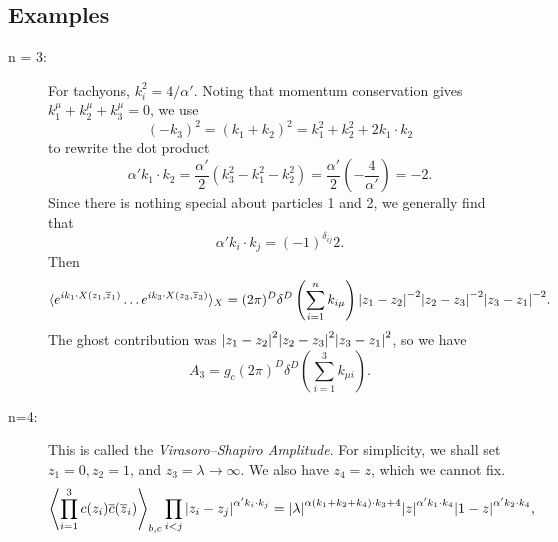 
\subsection{Examples}%
\label{sub:examples}

\begin{description}
  \item[n = 3:]  For tachyons, $k_i^2 = 4 / \alpha'$. Noting that momentum conservation gives $k_1^{\mu} + k_2^{\mu} + k_3^{\mu} = 0$, we use
    \begin{equation}
      (-k_3)^2 = (k_1 + k_2)^2 = k_1^2 + k_2^2 + 2 k_1 \cdot k_2
    \end{equation}
    to rewrite the dot product
    \begin{equation}
      \alpha' k_1 \cdot k_2 = \frac{\alpha'}{2} (k_3^2 - k_1^2 - k_2^2) = \frac{\alpha'}{2} \left(-\frac{4}{\alpha'}\right) = -2.
    \end{equation}
    Since there is nothing special about particles 1 and 2, we generally find that
    \begin{equation}
      \alpha' k_i \cdot k_j = (-1)^{\delta_{ij}} 2.
    \end{equation}
    Then
    \begin{equation}
      \langle e^{i k_1 \cdot X(z_1, \overline{z}{}_1)} \dots e^{i k_3 \cdot X(z_3, \overline{z}{}_3)} \rangle_X = (2\pi)^D \delta^D\left(\sum_{i=1}^n k_{i\mu}\right) \abs{z_1 - z_2}^{-2} \abs{z_2 - z_3}^{-2} \abs{z_3 - z_1}^{-2}.
    \end{equation}
    The ghost contribution was $\abs{z_1 - z_2}^{2} \abs{z_2 - z_3}^{2} \abs{z_3 - z_1}^{2}$, so we have
    \begin{equation}
      A_3 = g_c(2\pi)^D \delta^D \left( \sum_{i=1}^{3} k_{\mu i} \right).
    \end{equation}
\begin{figure}[tbhp]
  \centering
  \caption{}
  \label{fig:l23f1}
\end{figure}
  \item[n=4:] This is called the \emph{Virasoro--Shapiro Amplitude}.
    For simplicity, we shall set $z_1 = 0, z_2 = 1$, and $z_3 = \lambda \to \infty$. We also have $z_4 = z$, which we cannot fix.
    \begin{equation}
      \left\langle \prod_{i=1}^{3} c(z_{i}) \overline{c}{}(\overline{z}{}_i) \right\rangle_{b, c} \prod_{i < j} \abs{z_i - z_j}^{\alpha' k_i \cdot k_j} = \abs{\lambda}^{\alpha (k_1 + k_2 + k_4) \cdot k_3 + 4} \abs{z}^{\alpha' k_1 \cdot k_4} \abs{1 - z}^{\alpha' k_2 \cdot k_4},

\end{equation}
\end{description}
